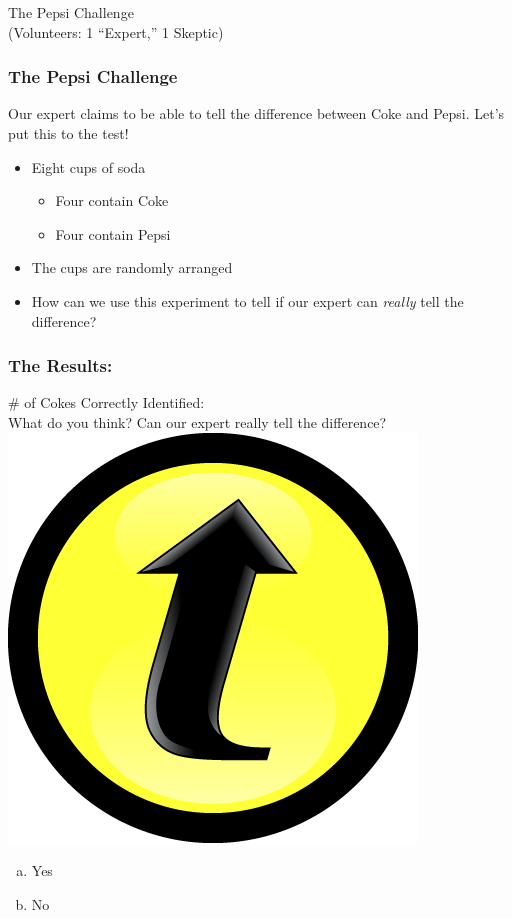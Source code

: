 \documentclass[handout]{beamer}
\begin{document}
\begin{frame}
\begin{center}
\Huge The Pepsi Challenge \\
	\large (Volunteers: 1 ``Expert,'' 1 Skeptic)
\end{center}
\end{frame}
\begin{frame}
\frametitle{The Pepsi Challenge}
Our expert claims to be able to tell the difference between Coke and Pepsi. Let's put this to the test! 
\begin{itemize}
\item Eight cups of soda 
	\begin{itemize}
\item Four contain Coke 
\item Four contain Pepsi 
\end{itemize}
	\item The cups are randomly arranged 
	\item How can we use this experiment to tell if our expert can \emph{\alert{really}} tell the difference?
\end{itemize}
\end{frame}
\begin{frame}
\frametitle{The Results:}
	\# of Cokes Correctly Identified: \\ \vspace{2em}
	\alert{What do you think? Can our expert really tell the difference? \includegraphics[scale = 0.05]{./images/clicker}}
		\begin{enumerate}[(a)]
\item Yes
\item No
\end{enumerate}
\end{frame}
\end{document}
